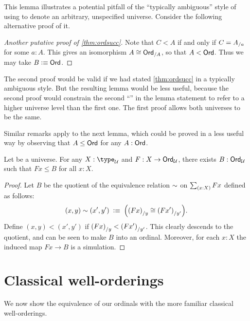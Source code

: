 This lemma illustrates a potential pitfall of the ``typically ambiguous'' style of using \UU to denote an arbitrary, unspecified universe.
Consider the following alternative proof of it.

\begin{proof}[Another putative proof of \autoref{thm:ordsucc}]
  Note that $C<A$ if and only if $C={A}_{/a}$ for some $a:A$.
  This gives an isomorphism $A \cong {\ensuremath{\mathsf{Ord}}}_{/A}$, so that $A<\mathsf{Ord}$.
  Thus we may take $B\vcentcolon\equiv\mathsf{Ord}$.
\end{proof}

The second proof would be valid if we had stated \autoref{thm:ordsucc} in a typically ambiguous style.
But the resulting lemma would be less useful, because the second proof would constrain the second ``\ord'' in the lemma statement to refer to a higher universe level than the first one.
The first proof allows both universes to be the same.

Similar remarks apply to the next lemma, which could be proved in a less useful way by observing that $A\le \mathsf{Ord}$ for any $A:\mathsf{Ord}$.

\begin{lem}\label{thm:ordunion}
  Let \bbU be a universe.
  For any $X:\type_\bbU$ and $F:X\to \mathsf{Ord}_\mathcal{U}$, there exists $B:\mathsf{Ord}_\mathcal{U}$ such that $Fx\le B$ for all $x:X$.
\end{lem}
\begin{proof}
  Let $B$ be the quotient of the equivalence relation $\sim$ on $\sm{x:X} Fx$ defined as follows:
  \[ (x,y) \sim (x',y')
  \;\vcentcolon\equiv\;
  \Big({(Fx)}_{/y} \cong {(Fx')}_{/y'}\Big).
  \]
  Define $(x,y)<(x',y')$ if ${(Fx)}_{/y} < {(Fx')}_{/y'}$.
  This clearly descends to the quotient, and can be seen to make $B$ into an ordinal.
  Moreover, for each $x:X$ the induced map $Fx\to B$ is a simulation.
\end{proof}



\section{Classical well-orderings}
\label{sec:wellorderings}

%
We now show the equivalence of our ordinals with the more familiar classical well-orderings.

